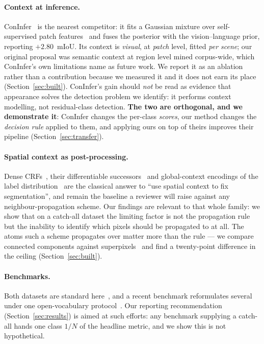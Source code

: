 \documentclass[10pt,a4paper]{article}                        %
\newcommand{\best}[1]{\textbf{#1}}
\begin{document}
\paragraph{Context at inference.} ConInfer~\cite{coninfer} is the nearest
competitor: it fits a Gaussian mixture over self-supervised patch
features~\cite{dinov2} and fuses the posterior with the vision--language prior,
reporting $+2.80$~mIoU. Its context is \emph{visual}, at \emph{patch} level,
fitted \emph{per scene}; our original proposal was semantic context at region
level mined corpus-wide, which ConInfer's own limitations name as future work. We
report it as an ablation rather than a contribution because we measured it and it
does not earn its place (Section~\ref{sec:built}). ConInfer's gain should
\emph{not} be read as evidence that appearance solves the detection problem we
identify: it performs context modelling, not residual-class detection.
\best{The two are orthogonal, and we demonstrate it}: ConInfer changes the
per-class \emph{scores}, our method changes the \emph{decision rule} applied to
them, and applying ours on top of theirs improves their pipeline
(Section~\ref{sec:transfer}).

\paragraph{Spatial context as post-processing.} Dense CRFs~\cite{densecrf}, their
differentiable successors~\cite{crfasrnn} and global-context encodings of the
label distribution~\cite{encnet} are the classical answer to ``use spatial
context to fix segmentation'', and remain the baseline a reviewer will raise
against any neighbour-propagation scheme. Our findings are relevant to that whole
family: we show that on a catch-all dataset the limiting factor is not the
propagation rule but the inability to identify which pixels should be propagated
to at all. The atoms such a scheme propagates over matter more than the rule ---
we compare connected components against superpixels~\cite{slic,felzenszwalb} and
find a twenty-point difference in the ceiling (Section~\ref{sec:built}).

\paragraph{Benchmarks.} Both datasets are standard
here~\cite{loveda,openearthmap}, and a recent benchmark reformulates several
under one open-vocabulary protocol~\cite{ovrsisbench}. Our reporting
recommendation (Section~\ref{sec:results}) is aimed at such efforts: any
benchmark supplying a catch-all hands one class $1/N$ of the headline metric, and
we show this is not hypothetical.
\end{document}
